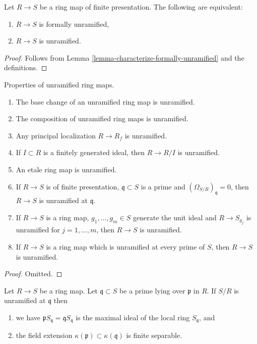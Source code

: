 \begin{lemma}
\label{lemma-formally-unramified-unramified}
Let $R \to S$ be a ring map of finite presentation.
The following are equivalent:
\begin{enumerate}
\item $R \to S$ is formally unramified,
\item $R \to S$ is unramified.
\end{enumerate}
\end{lemma}

\begin{proof}
Follows from Lemma \ref{lemma-characterize-formally-unramified}
and the definitions.
\end{proof}

\begin{lemma}
\label{lemma-unramified}
Properties of unramified ring maps.
\begin{enumerate}
\item The base change of an unramified ring map is unramified.
\item The composition of unramified ring maps is unramified.
\item Any principal localization $R \to R_f$ is unramified.
\item If $I \subset R$ is a finitely generated ideal, then
$R \to R/I$ is unramified.
\item An etale ring map is unramified.
\item If $R \to S$ is of finite presentation, $\mathfrak q \subset S$
is a prime and $(\Omega_{S/R})_{\mathfrak q} = 0$, then
$R \to S$ is unramified at $\mathfrak q$.
\item If $R \to S$ is a ring map, $g_1, \ldots, g_m \in S$ generate
the unit ideal and $R \to S_{g_j}$ is unramified for
$j = 1, \ldots, m$, then $R \to S$ is unramified.
\item If $R \to S$ is a ring map which is unramified at every prime
of $S$, then $R \to S$ is unramified.
\end{enumerate}
\end{lemma}

\begin{proof}
Omitted.
\end{proof}

\begin{lemma}
\label{lemma-unramified-at-prime}
Let $R \to S$ be a ring map.
Let $\mathfrak q \subset S$ be
a prime lying over $\mathfrak p$ in $R$.
If $S/R$ is unramified at $\mathfrak q$ then
\begin{enumerate}
\item we have $\mathfrak p S_{\mathfrak q} = \mathfrak qS_{\mathfrak q}$
is the maximal ideal of the local ring $S_{\mathfrak q}$, and
\item the field extension $\kappa(\mathfrak p) \subset \kappa(\mathfrak q)$
is finite separable.
\end{enumerate}
\end{lemma}

